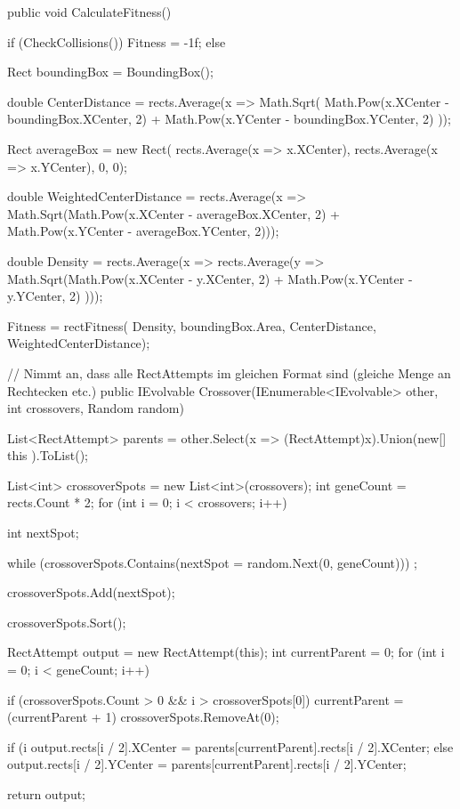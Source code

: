 \documentclass{article}
\begin{document}
\begin{flushleft}
\begin{Csharp}
{    public void CalculateFitness()
    {
        if (CheckCollisions()) Fitness = -1f;
        else
        {
            Rect boundingBox = BoundingBox();

            double CenterDistance =
                rects.Average(x => Math.Sqrt(
                    Math.Pow(x.XCenter - boundingBox.XCenter, 2) +
                    Math.Pow(x.YCenter - boundingBox.YCenter, 2)
                ));

            Rect averageBox = new Rect(
                rects.Average(x => x.XCenter), rects.Average(x => x.YCenter), 0, 0);

            double WeightedCenterDistance =
                rects.Average(x => 
                    Math.Sqrt(Math.Pow(x.XCenter - averageBox.XCenter, 2)
                    + Math.Pow(x.YCenter - averageBox.YCenter, 2)));

            double Density =
                rects.Average(x => rects.Average(y => 
                    Math.Sqrt(Math.Pow(x.XCenter - y.XCenter, 2)
                    + Math.Pow(x.YCenter - y.YCenter, 2) )));

            Fitness = rectFitness(
            	Density, 
            	boundingBox.Area, 
            	CenterDistance,
            	WeightedCenterDistance);
        }
    }

    // Nimmt an, dass alle RectAttempts im gleichen Format sind (gleiche Menge an Rechtecken etc.)
    public IEvolvable Crossover(IEnumerable<IEvolvable> other, int crossovers, Random random)
    {
        List<RectAttempt> parents = other.Select(x => (RectAttempt)x).Union(new[] { this }).ToList();

        List<int> crossoverSpots = new List<int>(crossovers);
        int geneCount = rects.Count * 2;
        for (int i = 0; i < crossovers; i++)
        {
            int nextSpot;

            while (crossoverSpots.Contains(nextSpot = random.Next(0, geneCount))) ;

            crossoverSpots.Add(nextSpot);
        }
        crossoverSpots.Sort();

        RectAttempt output = new RectAttempt(this);
        int currentParent = 0;
        for (int i = 0; i < geneCount; i++)
        {
            if (crossoverSpots.Count > 0 && i > crossoverSpots[0])
            {
                currentParent = (currentParent + 1) %
                crossoverSpots.RemoveAt(0);
            }

            if (i %
            {
                output.rects[i / 2].XCenter = 
                	parents[currentParent].rects[i / 2].XCenter;
            }
            else
            {
                output.rects[i / 2].YCenter = 
                	parents[currentParent].rects[i / 2].YCenter;
            }
        }
        return output;
    }

}
\end{Csharp}
\end{flushleft}
\end{document}

